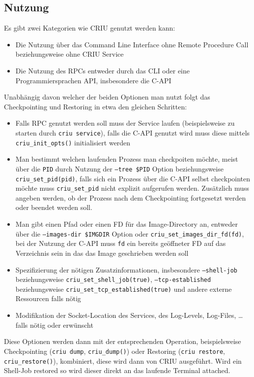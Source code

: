 \documentclass[a4paper]{article}
\begin{document}
\subsection{Nutzung}
Es gibt zwei Kategorien wie CRIU genutzt werden kann:
\begin{itemize}
    \item Die Nutzung über das Command Line Interface ohne Remote Procedure Call beziehungsweise ohne CRIU Service
    \item Die Nutzung des RPCs entweder durch das CLI oder eine Programmiersprachen API, insbesondere die C-API
\end{itemize}
Unabhängig davon welcher der beiden Optionen man nutzt folgt das Checkpointing und Restoring in etwa den gleichen Schritten:
\begin{itemize}
    \item Falls RPC genutzt werden soll muss der Service laufen (beispielsweise zu starten durch \texttt{criu service}), falls die C-API genutzt wird muss diese mittels \texttt{criu\_init\_opts()} initialisiert werden
    \item Man bestimmt welchen laufenden Prozess man checkpoiten möchte, meist über die \texttt{PID} durch Nutzung der \texttt{--tree \$PID} Option beziehungsweise \texttt{criu\_set\_pid(pid)}, falls sich ein Prozess über die C-API selbst checkpointen möchte muss \texttt{criu\_set\_pid} nicht explizit aufgerufen werden. Zusätzlich muss angeben werden, ob der Prozess nach dem Checkpointing fortgesetzt werden oder beendet werden soll.
    \item Man gibt einen Pfad oder einen FD für das Image-Directory an, entweder über die \texttt{--images-dir \$IMGDIR} Option oder \texttt{criu\_set\_images\_dir\_fd(fd)}, bei der Nutzung der C-API muss \texttt{fd} ein bereits geöffneter FD auf das Verzeichnis sein in das das Image geschrieben werden soll
    \item Spezifizierung der nötigen Zusatzinformationen, insbesondere \texttt{--shell-job} beziehungsweise \texttt{criu\_set\_shell\_job(true)}, \texttt{--tcp-established} beziehungsweise \texttt{criu\_set\_tcp\_established(true)} und andere externe Ressourcen falls nötig
    \item Modifikation der Socket-Location des Services, des Log-Levels, Log-Files, \dots falls nötig oder erwünscht
\end{itemize}
Diese Optionen werden dann mit der entsprechenden Operation, beispielsweise Checkpointing (\texttt{criu dump}, \texttt{criu\_dump()}) oder Restoring (\texttt{criu restore}, \texttt{criu\_restore()}), kombiniert, diese wird dann von CRIU ausgeführt. Wird ein Shell-Job restored so wird dieser direkt an das laufende Terminal attached.
\end{document}
